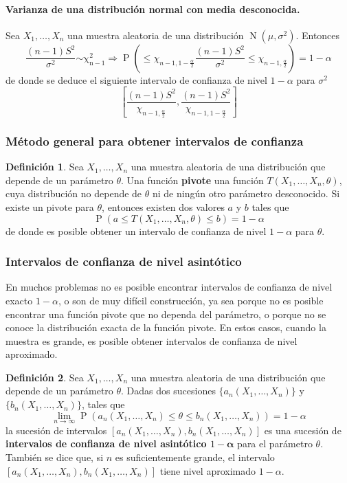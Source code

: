\documentclass[11pt]{article}
\theoremstyle{plain}
\theoremstyle{definition}
\newtheorem*{defi}{Definición}
\theoremstyle{remark}
\newcommand{\deft}[1]{\textbf{#1}}  %
\newcommand{\proba}{\ensuremath{\operatorname{P}}}  %
\newcommand{\dists}[1]{\ensuremath{\operatorname{#1}}}  %
\newcommand{\dist}[1]{\ensuremath{\sim \operatorname{#1}}}  %
\begin{document}
      \paragraph{Varianza de una distribución normal con media desconocida.} Sea $X_1, \dots, X_n$ una muestra aleatoria de una distribución $\dists{N}(\mu,\sigma^2)$. Entonces
      \[ \frac{(n - 1) S^2}{\sigma^2} \dist{\chi_{n-1}^2} \Rightarrow \proba\left( \leq \chi_{n - 1, 1 - \frac{\alpha}{2}} \frac{(n - 1) S^2}{\sigma^2} \leq \chi_{n - 1, \frac{\alpha}{2}} \right) = 1 - \alpha \]
      de donde se deduce el siguiente intervalo de confianza de nivel $1 - \alpha$ para $\sigma^2$
      \[ \left[ \frac{(n-1) S^2}{\chi_{n - 1, \frac{\alpha}{2}}} , \frac{(n-1) S^2}{\chi_{n - 1, 1 - \frac{\alpha}{2}}} \right] \]

    \subsubsection{Método general para obtener intervalos de confianza}

      \begin{defi}
        Sea $X_1, \dots, X_n$ una muestra aleatoria de una distribución que depende de un parámetro $\theta$. Una función \deft{pivote} una función $T(X_1,\dots,X_n,\theta)$, cuya distribución no depende de $\theta$ ni de ningún otro parámetro desconocido. Si existe un pivote para $\theta$, entonces existen dos valores $a$ y $b$ tales que
        \[ \proba(a \leq T(X_1,\dots,X_n,\theta) \leq b) = 1 - \alpha \]
        de donde es posible obtener un intervalo de confianza de nivel $1 - \alpha$ para $\theta$.
      \end{defi}

    \subsubsection{Intervalos de confianza de nivel asintótico}

      En muchos problemas no es posible encontrar intervalos de confianza de nivel exacto $1 - \alpha$, o son de muy difícil construcción, ya sea porque no es posible encontrar una función pivote que no dependa del parámetro, o porque no se conoce la distribución exacta de la función pivote. En estos casos, cuando la muestra es grande, es posible obtener intervalos de confianza de nivel aproximado.

      \begin{defi}
        Sea $X_1, \dots, X_n$ una muestra aleatoria de una distribución que depende de un parámetro $\theta$. Dadas dos sucesiones $\lbrace a_n(X_1,\dots,X_n) \rbrace$ y $\lbrace b_n(X_1,\dots,X_n) \rbrace$, tales que
        \[ \lim_{n \to \infty} \proba(a_n(X_1,\dots,X_n) \leq \theta \leq b_n(X_1,\dots,X_n)) = 1 - \alpha \]
        la sucesión de intervalos $[a_n(X_1,\dots,X_n), b_n(X_1,\dots,X_n)]$ es una sucesión de \deft{intervalos de confianza de nivel asintótico $1 - \boldsymbol\alpha$} para el parámetro $\theta$. También se dice que, si $n$ es suficientemente grande, el intervalo $[a_n(X_1,\dots,X_n), b_n(X_1,\dots,X_n)]$ tiene nivel aproximado $1 - \alpha$.
      \end{defi}
\end{document}
